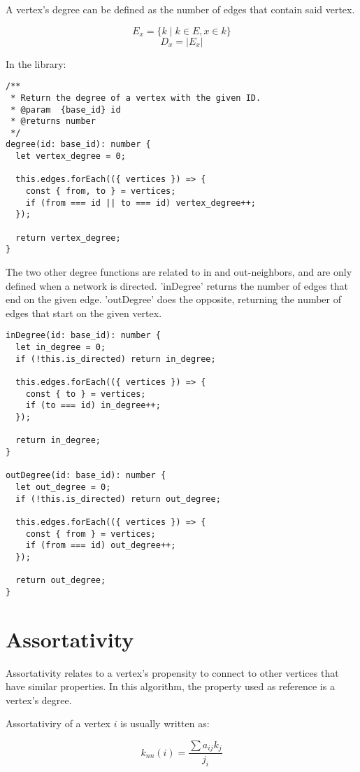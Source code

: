 A vertex's degree can be defined as the number of edges that contain said vertex.

$$E_x=\{k \mid k \in E, x \in k\}$$
$$D_x=|E_x|$$

In the library:

\begin{verbatim}
/**
 * Return the degree of a vertex with the given ID.
 * @param  {base_id} id
 * @returns number
 */
degree(id: base_id): number {
  let vertex_degree = 0;

  this.edges.forEach(({ vertices }) => {
    const { from, to } = vertices;
    if (from === id || to === id) vertex_degree++;
  });

  return vertex_degree;
}
\end{verbatim}

The two other degree functions are related to in and out-neighbors,
and are only defined when a network is directed.
'inDegree' returns the number of edges that end on the given edge.
'outDegree' does the opposite, returning the number of edges that start on the given vertex.

\begin{verbatim}
inDegree(id: base_id): number {
  let in_degree = 0;
  if (!this.is_directed) return in_degree;

  this.edges.forEach(({ vertices }) => {
    const { to } = vertices;
    if (to === id) in_degree++;
  });

  return in_degree;
}

outDegree(id: base_id): number {
  let out_degree = 0;
  if (!this.is_directed) return out_degree;

  this.edges.forEach(({ vertices }) => {
    const { from } = vertices;
    if (from === id) out_degree++;
  });

  return out_degree;
}
\end{verbatim}

\section{Assortativity}

Assortativity relates to a vertex's propensity to connect to other vertices that have similar properties.
In this algorithm, the property used as reference is a vertex's degree.

Assortativiry of a vertex $i$ is usually written as:

$$k_{nn}(i)=\frac{\sum{a_{ij}k_{j}}}{j_i}$$

